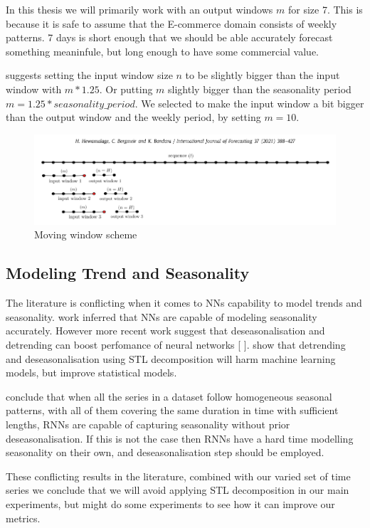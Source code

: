 In this thesis we will primarily work with an output windows $m$ for size 7.
This is because it is safe to assume that the E-commerce domain consists of weekly patterns.
7 days is short enough that we should be able accurately forecast something meaninfule,
but long enough to have some commercial value.

\cite{Hewamalage2021} suggests setting the input window size $n$ to be slightly
bigger than the input window with $m * 1.25$. Or putting $m$ slightly bigger than
the seasonality period $m = 1.25 * seasonality\_period$.
We selected to make the input window a bit bigger than the output window and the weekly
period, by setting $m = 10$.
\begin{figure}[h!]
  \centering
  \includegraphics[width=\textwidth]{./figs/illustrations/moving_window_illustration.png}
  \hfill
  \caption{Moving window scheme \citep{Hewamalage2021}}
  \label{fig:dataset:moving_window_scheme}
\end{figure}



\subsection{Modeling Trend and Seasonality}
The literature is conflicting when it comes to NNs capability to
model trends and seasonality. \cite{Sharda1992} work inferred that NNs are
capable of modeling seasonality accurately.
However more recent work suggest that deseasonalisation and
detrending can boost perfomance of neural networks [\cite{Zhang2005} \cite{Smyl2020}].
\cite{Ouyang2021} show that detrending and deseasonalisation using STL decomposition
will harm machine learning models, but improve statistical models.

\cite{Hewamalage2021} conclude that when all the series in a dataset follow
homogeneous seasonal patterns, with all of them covering the same duration in time
with sufficient lengths, RNNs are capable of capturing seasonality
without prior deseasonalisation.
If this is not the case then RNNs have a hard time modelling
seasonality on their own, and deseasonalisation step should be employed.

These conflicting results in the literature, combined with our varied set of time series
we conclude that we will avoid applying STL decomposition in our main experiments,
but might do some experiments to see how it can improve our metrics.


